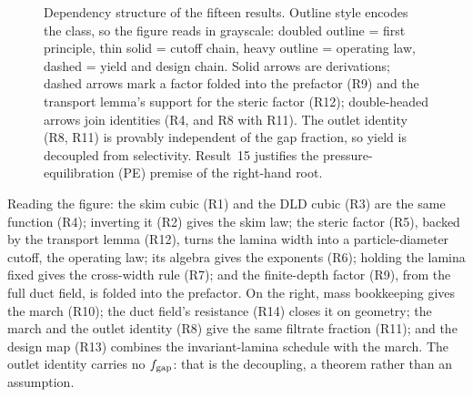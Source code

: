 \begin{figure}[htbp]
\caption{Dependency structure of the fifteen results. Outline style encodes the class, so the
figure reads in grayscale: doubled outline = first principle, thin solid = cutoff chain, heavy
outline = operating law, dashed = yield and design chain. Solid arrows are derivations; dashed
arrows mark a factor folded into the prefactor (R9) and the transport lemma's support for the
steric factor (R12); double-headed arrows join identities (R4, and R8 with R11). The outlet
identity (R8, R11) is provably independent of the gap fraction, so yield is decoupled from
selectivity. Result~15 justifies the pressure-equilibration (PE) premise of the right-hand root.}
\label{fig:dag}
\end{figure}

\noindent Reading the figure: the skim cubic (R1) and the DLD cubic (R3) are the same function
(R4); inverting it (R2) gives the skim law; the steric factor (R5), backed by the transport lemma
(R12), turns the lamina width into a particle-diameter cutoff, the operating law; its algebra
gives the exponents (R6); holding the lamina fixed gives the cross-width rule (R7); and the
finite-depth factor (R9), from the full duct field, is folded into the prefactor. On the right,
mass bookkeeping gives the march (R10); the duct field's resistance (R14) closes it on geometry;
the march and the outlet identity (R8) give the same filtrate fraction (R11); and the design map
(R13) combines the invariant-lamina schedule with the march. The outlet identity carries no
$f_{\mathrm{gap}}$: that is the decoupling, a theorem rather than an assumption.

